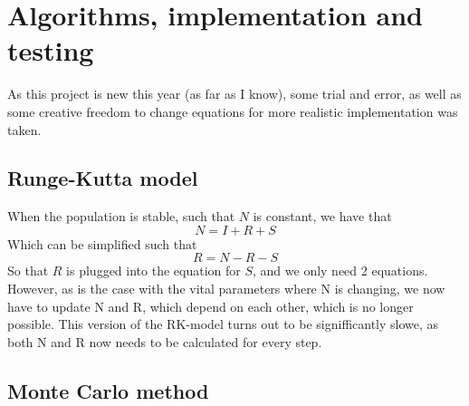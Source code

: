\section{Algorithms, implementation and testing}
As this project is new this year (as far as I know), some trial and error, as well as some creative freedom to change equations for more realistic implementation was taken.



\subsection{Runge-Kutta model}


When the population is stable, such that $N$ is constant, we have that
\begin{equation}
    N=I+R+S
\end{equation}
Which can be simplified such that
$$
R=N-R-S
$$
So that $R$ is plugged into the equation for $S$, and we only need 2 equations. 
However, as is the case with the vital parameters where N is changing, we now have to update N and R, which depend on each other, 
which is no longer possible. This version of the RK-model turns out to be signifficantly slowe, as both N and R now needs to be calculated for every step.

\subsection{Monte Carlo method}